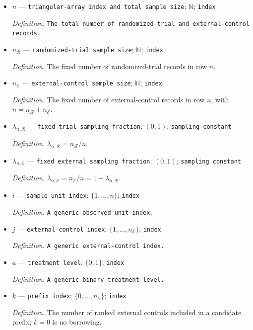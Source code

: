 \documentclass{article}
\begin{document}
\begin{itemize}
  \item \(n\) --- \texttt{triangular-\allowbreak{}array index and total sample size}; \(\mathbb N\); \texttt{index}
  \par\smallskip\noindent\emph{Definition.} \texttt{The total number of randomized-\allowbreak{}trial and external-\allowbreak{}control records.}
  \item \(n_{\mathcal R}\) --- \texttt{randomized-\allowbreak{}trial sample size}; \(\mathbb N\); \texttt{index}
  \par\smallskip\noindent\emph{Definition.} The fixed number of randomized-trial records in row \(n\).
  \item \(n_{\mathcal E}\) --- \texttt{external-\allowbreak{}control sample size}; \(\mathbb N\); \texttt{index}
  \par\smallskip\noindent\emph{Definition.} The fixed number of external-control records in row \(n\), with \(n=n_{\mathcal R}+n_{\mathcal E}\).
  \item \(\lambda_{n,\mathcal R}\) --- \texttt{fixed trial sampling fraction}; \((0,1)\); \texttt{sampling constant}
  \par\smallskip\noindent\emph{Definition.} \(\lambda_{n,\mathcal R}=n_{\mathcal R}/n\).
  \item \(\lambda_{n,\mathcal E}\) --- \texttt{fixed external sampling fraction}; \((0,1)\); \texttt{sampling constant}
  \par\smallskip\noindent\emph{Definition.} \(\lambda_{n,\mathcal E}=n_{\mathcal E}/n=1-\lambda_{n,\mathcal R}\).
  \item \(i\) --- \texttt{sample-\allowbreak{}unit index}; \(\{1,\ldots,n\}\); \texttt{index}
  \par\smallskip\noindent\emph{Definition.} \texttt{A generic observed-\allowbreak{}unit index.}
  \item \(j\) --- \texttt{external-\allowbreak{}control index}; \(\{1,\ldots,n_{\mathcal E}\}\); \texttt{index}
  \par\smallskip\noindent\emph{Definition.} \texttt{A generic external-\allowbreak{}control index.}
  \item \(a\) --- \texttt{treatment level}; \(\{0,1\}\); \texttt{index}
  \par\smallskip\noindent\emph{Definition.} \texttt{A generic binary treatment level.}
  \item \(k\) --- \texttt{prefix index}; \(\{0,\ldots,n_{\mathcal E}\}\); \texttt{index}
  \par\smallskip\noindent\emph{Definition.} The number of ranked external controls included in a candidate prefix; \(k=0\) is no borrowing.

\end{itemize}
\end{document}
